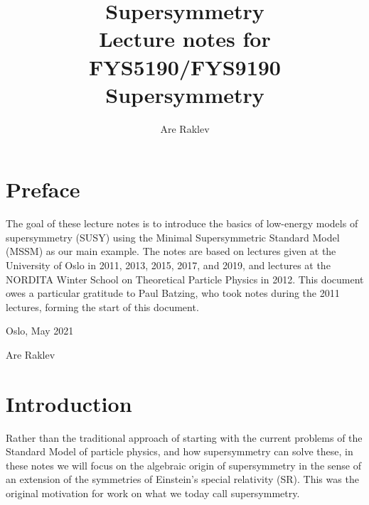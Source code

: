 \documentclass[11pt,a4paper]{book}
\title{{\Huge Supersymmetry} \\ 
\vspace{5mm} Lecture notes for FYS5190/FYS9190 Supersymmetry}
\author{Are Raklev}
\begin{document}

\maketitle


\chapter*{Preface}


The goal of these lecture notes is to introduce the basics of low-energy models of supersymmetry (SUSY) using the Minimal Supersymmetric Standard Model (MSSM) as our main example. The notes are based on lectures given at the University of Oslo in 2011, 2013, 2015, 2017, and 2019, and lectures at the NORDITA Winter School on Theoretical Particle Physics in 2012. This document owes a particular gratitude to Paul Batzing, who took notes during the 2011 lectures, forming the start of this document.


\vspace{5mm}
Oslo, May 2021

Are Raklev





\tableofcontents



\chapter*{Introduction}
Rather than the traditional approach of starting with the current problems of the Standard Model of particle physics, and how supersymmetry can solve these, in these notes we will focus on the algebraic origin of supersymmetry in the sense of an extension of the symmetries of Einstein's special relativity (SR). This was the original motivation for work on what we today call supersymmetry. 
\end{document}
